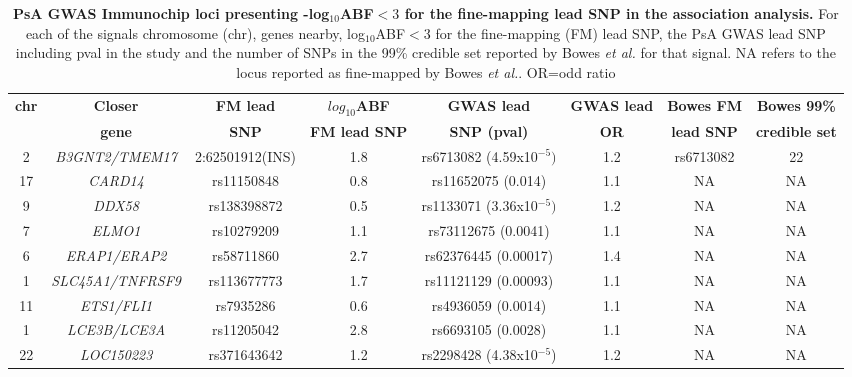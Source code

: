 \begin{landscape}
\begin{center}
\begin{longtable}[ht]{c c c c c c c c}
\caption[PsA GWAS Immunochip loci presenting log${_10}$ABF$<3$ for the fine-mapping lead SNP in the association analysis.]{\textbf{PsA GWAS Immunochip loci presenting -log${_10}$ABF$<3$ for the fine-mapping lead SNP in the association analysis.} For each of the signals chromosome (chr), genes nearby, log${_10}$ABF$<3$ for the fine-mapping (FM) lead SNP, the PsA GWAS lead SNP including pval in the study and the number of SNPs in the 99\% credible set reported by Bowes \textit{et al.} for that signal. NA refers to the locus reported as fine-mapped by Bowes \textit{et al.}. OR=odd ratio}
\label{tab:PsA_loci_no_fine_mapping}\\
\toprule
\textbf{chr} & \textbf{Closer} & \textbf{FM lead} &\textbf{$log_{10}$ABF} & \textbf{GWAS lead}  &  \textbf{GWAS lead}   &\textbf{Bowes FM} & \textbf{Bowes 99\%} \\
             & \textbf{gene} & \textbf{SNP}    &\textbf{FM lead SNP}   & \textbf{SNP (pval)} &  \textbf{OR}          &\textbf{lead SNP} & \textbf{credible set} \\
\midrule
\midrule
2	 & \textit{B3GNT2/TMEM17} & 2:62501912(INS)  &1.8   & rs6713082 (4.59x10$^{-5})$ & 1.2 &rs6713082	& 22 \\
17 & \textit{CARD14}	      & rs11150848 &0.8  & rs11652075 (0.014)       &  1.1  &NA	& NA \\
9	 & \textit{DDX58}	        &rs138398872&	0.5   & rs1133071 (3.36x10$^{-5})$ & 1.2 &	NA	&NA \\
7	 & \textit{ELMO1}	        &rs10279209&	1.1   & rs73112675 (0.0041)        &	1.1 &NA	& NA \\
6	 & \textit{ERAP1/ERAP2}	  &rs58711860&	2.7 	& rs62376445 (0.00017) & 1.4 &	NA	&NA \\
1	 & \textit{SLC45A1/TNFRSF9} &rs113677773	&	1.7 &	rs11121129 (0.00093) & 1.1 & NA	& NA \\
11 & \textit{ETS1/FLI1}	    &rs7935286&	0.6   & rs4936059 (0.0014)	& 1.1  & NA  &	NA \\ 
1	 & \textit{LCE3B/LCE3A}	  &rs11205042&	2.8 	& rs6693105 (0.0028)	& 1.1 & NA	& NA \\
22 & \textit{LOC150223}	    &rs371643642&	1.2   & rs2298428 (4.38x10$^{-5}$) & 1.2	& NA	& NA \\

\end{longtable}
\end{center}
\end{landscape}

